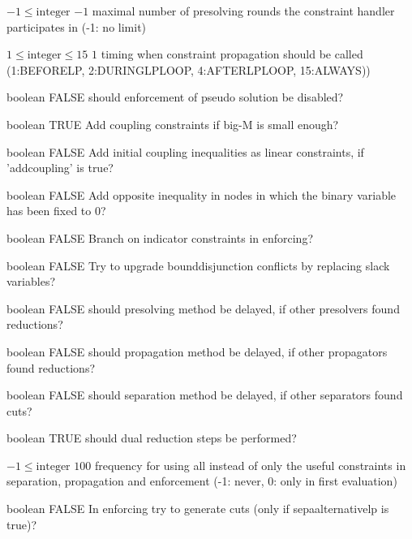 %
{$-1\leq\textrm{integer}$}%
{$-1$}%
{maximal number of presolving rounds the constraint handler participates in (-1: no limit)}%
{}

%
{$1\leq\textrm{integer}\leq15$}%
{$1$}%
{timing when constraint propagation should be called (1:BEFORELP, 2:DURINGLPLOOP, 4:AFTERLPLOOP, 15:ALWAYS))}%
{}

%
{boolean}%
{FALSE}%
{should enforcement of pseudo solution be disabled?}%
{}

%
{boolean}%
{TRUE}%
{Add coupling constraints if big-M is small enough?}%
{}

%
{boolean}%
{FALSE}%
{Add initial coupling inequalities as linear constraints, if 'addcoupling' is true?}%
{}

%
{boolean}%
{FALSE}%
{Add opposite inequality in nodes in which the binary variable has been fixed to 0?}%
{}

%
{boolean}%
{FALSE}%
{Branch on indicator constraints in enforcing?}%
{}

%
{boolean}%
{FALSE}%
{Try to upgrade bounddisjunction conflicts by replacing slack variables?}%
{}

%
{boolean}%
{FALSE}%
{should presolving method be delayed, if other presolvers found reductions?}%
{}

%
{boolean}%
{FALSE}%
{should propagation method be delayed, if other propagators found reductions?}%
{}

%
{boolean}%
{FALSE}%
{should separation method be delayed, if other separators found cuts?}%
{}

%
{boolean}%
{TRUE}%
{should dual reduction steps be performed?}%
{}

%
{$-1\leq\textrm{integer}$}%
{$100$}%
{frequency for using all instead of only the useful constraints in separation, propagation and enforcement (-1: never, 0: only in first evaluation)}%
{}

%
{boolean}%
{FALSE}%
{In enforcing try to generate cuts (only if sepaalternativelp is true)?}%
{}


